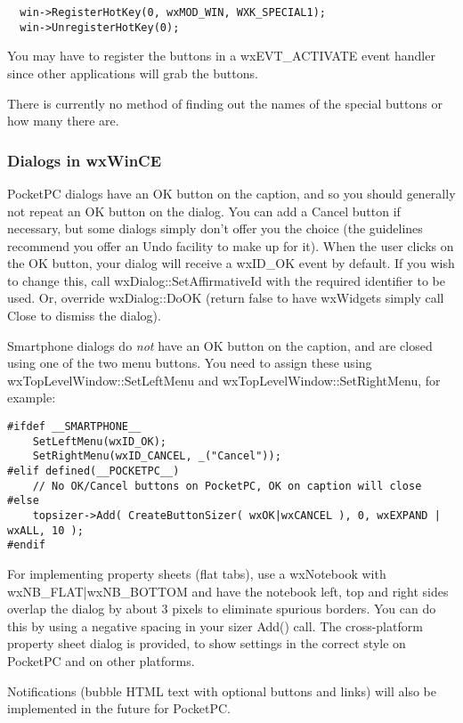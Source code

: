 \begin{verbatim}
  win->RegisterHotKey(0, wxMOD_WIN, WXK_SPECIAL1);
  win->UnregisterHotKey(0);
\end{verbatim}

You may have to register the buttons in a wxEVT\_ACTIVATE event handler
since other applications will grab the buttons.

There is currently no method of finding out the names of the special
buttons or how many there are.

\subsubsection{Dialogs in wxWinCE}

PocketPC dialogs have an OK button on the caption, and so you should generally
not repeat an OK button on the dialog. You can add a Cancel button if necessary, but some dialogs
simply don't offer you the choice (the guidelines recommend you offer an Undo facility
to make up for it). When the user clicks on the OK button, your dialog will receive
a wxID\_OK event by default. If you wish to change this, call wxDialog::SetAffirmativeId
with the required identifier to be used. Or, override wxDialog::DoOK (return false to
have wxWidgets simply call Close to dismiss the dialog).

Smartphone dialogs do {\it not} have an OK button on the caption, and are closed
using one of the two menu buttons. You need to assign these using wxTopLevelWindow::SetLeftMenu
and wxTopLevelWindow::SetRightMenu, for example:

\begin{verbatim}
#ifdef __SMARTPHONE__
    SetLeftMenu(wxID_OK);
    SetRightMenu(wxID_CANCEL, _("Cancel"));
#elif defined(__POCKETPC__)
    // No OK/Cancel buttons on PocketPC, OK on caption will close
#else
    topsizer->Add( CreateButtonSizer( wxOK|wxCANCEL ), 0, wxEXPAND | wxALL, 10 );
#endif
\end{verbatim}

For implementing property sheets (flat tabs), use a wxNotebook with wxNB\_FLAT|wxNB\_BOTTOM
and have the notebook left, top and right sides overlap the dialog by about 3 pixels
to eliminate spurious borders. You can do this by using a negative spacing in your
sizer Add() call. The cross-platform property sheet dialog  is
provided, to show settings in the correct style on PocketPC and on other platforms.

Notifications (bubble HTML text with optional buttons and links) will also be
implemented in the future for PocketPC.

